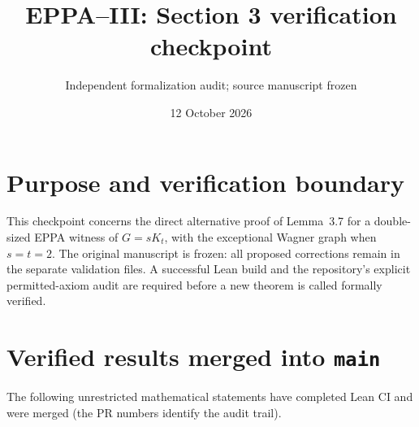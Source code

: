 \documentclass[11pt,a4paper]{article}
\title{EPPA--III: Section 3 verification checkpoint}
\author{Independent formalization audit; source manuscript frozen}
\date{12 October 2026}
\begin{document}
\maketitle

\section*{Purpose and verification boundary}

This checkpoint concerns the direct alternative proof of
Lemma~3.7 for a double-sized EPPA witness of
\(G=sK_t\), with the exceptional Wagner graph when
\(s=t=2\).  The original manuscript is frozen:
all proposed corrections remain in the separate validation files.
A successful Lean build and the repository's explicit permitted-axiom
audit are required before a new theorem is called formally verified.

\section*{Verified results merged into \texttt{main}}

The following unrestricted mathematical statements have completed
Lean CI and were merged (the PR numbers identify the audit trail).
\end{document}
